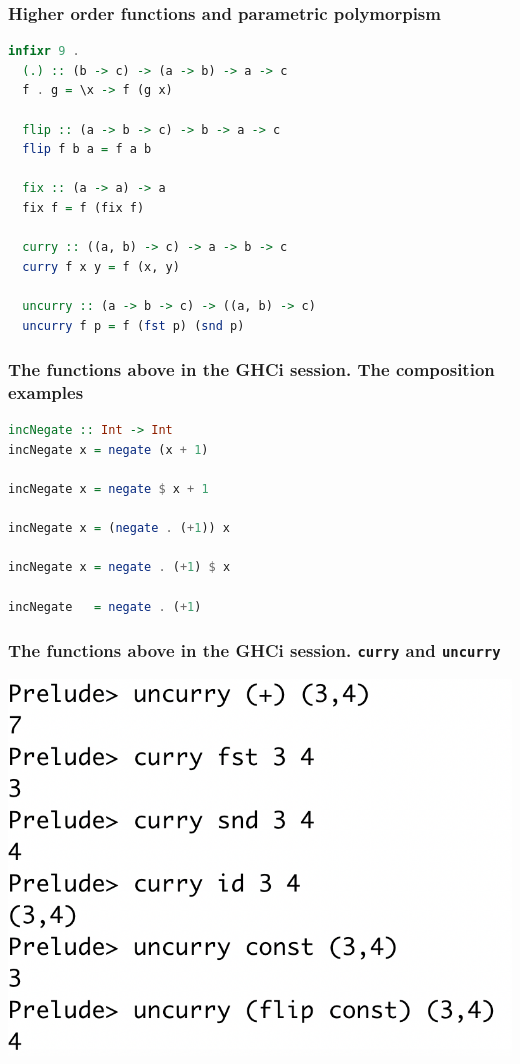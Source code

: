 \documentclass[10pt,pdf,utf8,russian,aspectratio=169]{beamer}
\begin{document}
\begin{frame}[fragile]
  \frametitle{Higher order functions and parametric polymorpism}

  \begin{lstlisting}[language=Haskell]
  infixr 9 .
  (.) :: (b -> c) -> (a -> b) -> a -> c
  f . g = \x -> f (g x)

  flip :: (a -> b -> c) -> b -> a -> c
  flip f b a = f a b

  fix :: (a -> a) -> a
  fix f = f (fix f)

  curry :: ((a, b) -> c) -> a -> b -> c
  curry f x y = f (x, y)

  uncurry :: (a -> b -> c) -> ((a, b) -> c)
  uncurry f p = f (fst p) (snd p)
  \end{lstlisting}
\end{frame}

\begin{frame}[fragile]
    \frametitle{The functions above in the GHCi session. The composition examples}

\begin{lstlisting}[language=Haskell]
incNegate :: Int -> Int
incNegate x = negate (x + 1)

incNegate x = negate $ x + 1

incNegate x = (negate . (+1)) x

incNegate x = negate . (+1) $ x

incNegate   = negate . (+1)
\end{lstlisting}
\end{frame}

\begin{frame}
  \frametitle{The functions above in the GHCi session. \verb"curry" and \verb"uncurry"}

  \begin{center}
  \includegraphics[scale=0.554]{Pics/Curry.png}
  \end{center}
\end{frame}
\end{document}
